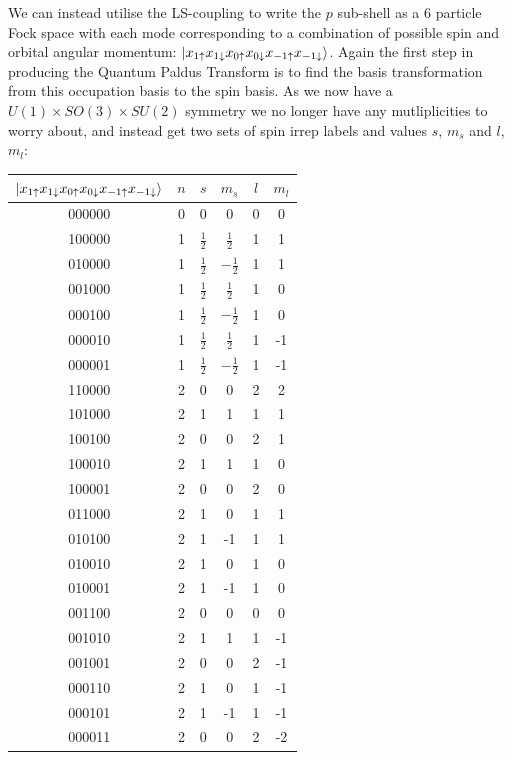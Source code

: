 \documentclass{article}
\begin{document}
We can instead utilise the LS-coupling to write the $p$ sub-shell as a 6 particle Fock space with each mode corresponding to a combination of possible spin and orbital angular momentum: $\ket{x_{1\uparrow}x_{1\downarrow}x_{0\uparrow}x_{0\downarrow}x_{-1\uparrow}x_{-1\downarrow}}$. Again the first step in producing the Quantum Paldus Transform is to find the basis transformation from this occupation basis to the spin basis. As we now have a $U(1) \times SO(3)\times SU(2)$ symmetry we no longer have any mutliplicities to worry about, and instead get two sets of spin irrep labels and values $s$, $m_s$ and $l$, $m_l$:
   \begin{tabular}{|c|c|c|c|c|c|}
   \hline
       $\ket{x_{1\uparrow}x_{1\downarrow}x_{0\uparrow}x_{0\downarrow}x_{-1\uparrow}x_{-1\downarrow}}$ &$n$& $s$&$m_s$&$l$&$m_l$  \\ \hline
       000000 & 0& 0&0&0&0 \\\hline
       100000 & 1&$\frac{1}{2}$ &$\frac{1}{2}$&1&1 \\\hline
       010000 & 1&$\frac{1}{2}$ &$-\frac{1}{2}$&1&1 \\\hline
       001000 & 1&$\frac{1}{2}$ &$\frac{1}{2}$&1&0 \\\hline
       000100 & 1&$\frac{1}{2}$ &$-\frac{1}{2}$&1&0 \\\hline
       000010 & 1&$\frac{1}{2}$ &$\frac{1}{2}$&1&-1 \\\hline
       000001 & 1&$\frac{1}{2}$ &$-\frac{1}{2}$&1&-1 \\\hline
       110000 & 2& 0&0&2 &2  \\\hline
       101000 & 2& 1&1&1 &1  \\\hline
       100100 & 2& 0&0&2 &1  \\\hline
       100010 & 2& 1&1&1 &0  \\\hline
       100001 & 2& 0&0&2&0  \\\hline
       011000 & 2& 1&0&1 &1  \\\hline
       010100 & 2& 1&-1&1 &1  \\\hline
       010010 & 2& 1&0&1 &0  \\\hline
       010001 & 2& 1&-1&1 &0  \\\hline
       001100 & 2& 0&0&0 &0  \\\hline
       001010 & 2& 1&1&1 &-1  \\\hline
       001001 & 2& 0&0&2 &-1  \\\hline
       000110 & 2& 1&0&1 &-1  \\\hline
       000101 & 2&1 &-1&1 &-1  \\\hline
       000011 & 2& 0&0&2 &-2  \\\hline
       
       
       \end{tabular}
       
\end{document}
